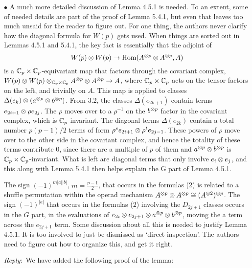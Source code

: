 \documentclass{amsart}
\newcommand{\ar}{\medskip\noindent\textit{Reply}:\ }
\def\subitem{\medskip\noindent$\bullet$ }
\begin{document}
\begin{enumerate}
	\subitem A much more detailed discussion of Lemma 4.5.1 is needed.
	To an extent, some of needed details are part of the proof of Lemma 5.4.1, but even that leaves too much unsaid for the	reader to figure out. For one thing, the authors never clarify how the diagonal formula for $W(p)$ gets used.
	When things are sorted out in Lemmas 4.5.1 and 5.4.1, the key fact is essentially that the adjoint of
	\[
	W(p) \otimes W(p) \to \mathrm{Hom}(A^{\otimes p} \otimes A^{\otimes p}, A)
	\]
	is a $\mathbb{C}_p \times \mathbb{C}_p$-equivariant map that factors through the covariant complex, $W(p) \otimes W(p) \otimes_{\mathbb{C}_p \times \mathbb{C}_p} A^{\otimes p} \otimes A^{\otimes p} \to A$, where $\mathbb{C}_p \times \mathbb{C}_p$ acts on the tensor factors on the left, and trivially on $A$.
	This map is applied to classes $\Delta(e_k) \otimes (a^{\otimes p} \otimes b^{\otimes p})$.
	From 3.2, the classes $\Delta(e_{2k+1})$ contain terms $e_{2i+1} \otimes \rho e_{2j}$.
	The $\rho$ moves over to a $\rho^{-1}$ on the $b^{\otimes p}$ factor in the covariant complex, which is $\mathbb{C}_p$ invariant.
	The diagonal terms $\Delta(e_{2k})$ contain a total number $p(p-1)/2$ terms of form $\rho^s e_{2i+1} \otimes \rho^t e_{2j-1}$.
	These powers of $\rho$ move over to the other side in the covariant	complex, and hence the totality of these terms contribute 0, since there are a multiple of $p$ of them and $a^{\otimes p} \otimes b^{\otimes p}$ is $\mathbb{C}_p \times \mathbb{C}_p$-invariant. What is left are diagonal terms that only involve $e_i \otimes e_j$, and this along with Lemma 5.4.1 then helps explain the G part of Lemma	4.5.1.

	\medskip\noindent
	The sign $(-1)^{m|a||b|}$, $m = \frac{p-1}{2}$, that occurs in the formulas (2) is related to a shuffle permutation within the operad mechanism $A^{\otimes p} \otimes A^{\otimes p} \cong (A^{\otimes 2})^{\otimes p}$.
	The sign $(-1)^{|a|}$ that occurs in the formulas (2) involving the $D_{2j+1}$ classes occurs in the $G$ part, in the evaluations of $e_{2i} \otimes e_{2j+1} \otimes a^{\otimes p} \otimes b^{\otimes p}$, moving the a term across the $e_{2j+1}$ term.
	Some discussion about all this is needed to justify Lemma 4.5.1.
	It is too involved to just be dismissed as `direct inspection’.
	The authors need to figure out how to organize this, and get it right.

	\ar We have added the following proof of the lemma:


\end{enumerate}
\end{document}
